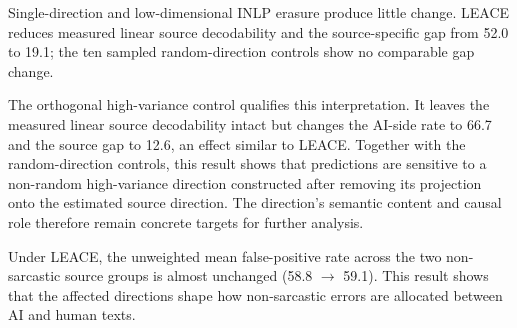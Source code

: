 Single-direction and low-dimensional INLP erasure produce little change. LEACE reduces measured linear source decodability and the source-specific gap from 52.0 to 19.1; the ten sampled random-direction controls show no comparable gap change.

The orthogonal high-variance control qualifies this interpretation. It leaves the measured linear source decodability intact but changes the AI-side rate to 66.7 and the source gap to 12.6, an effect similar to LEACE. Together with the random-direction controls, this result shows that predictions are sensitive to a non-random high-variance direction constructed after removing its projection onto the estimated source direction. The direction's semantic content and causal role therefore remain concrete targets for further analysis.

Under LEACE, the unweighted mean false-positive rate across the two non-sarcastic source groups is almost unchanged (58.8 $\to$ 59.1). This result shows that the affected directions shape how non-sarcastic errors are allocated between AI and human texts.
